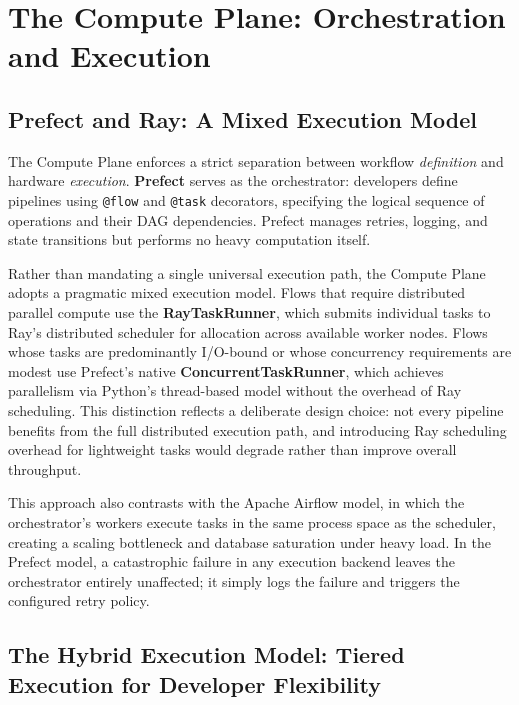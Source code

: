 \documentclass[12pt, a4paper]{report}
\begin{document}
\section{The Compute Plane: Orchestration and Execution}
\label{sec:compute_plane}

\subsection{Prefect and Ray: A Mixed Execution Model}
\label{ssec:prefect_ray}

The Compute Plane enforces a strict separation between workflow \emph{definition} and
hardware \emph{execution}.
\textbf{Prefect} serves as the orchestrator: developers define pipelines using
\texttt{@flow} and \texttt{@task} decorators, specifying the logical sequence of
operations and their DAG dependencies.
Prefect manages retries, logging, and state transitions but performs no heavy computation
itself.

Rather than mandating a single universal execution path, the Compute Plane adopts a
pragmatic mixed execution model. Flows that require distributed parallel compute use
the \textbf{RayTaskRunner}, which submits individual tasks to Ray's distributed
scheduler for allocation across available worker nodes. Flows whose tasks are
predominantly I/O-bound or whose concurrency requirements are modest use Prefect's
native \textbf{ConcurrentTaskRunner}, which achieves parallelism via Python's
thread-based model without the overhead of Ray scheduling. This distinction reflects a
deliberate design choice: not every pipeline benefits from the full distributed
execution path, and introducing Ray scheduling overhead for lightweight tasks would
degrade rather than improve overall throughput.

This approach also contrasts with the Apache Airflow model, in which the orchestrator's
workers execute tasks in the same process space as the scheduler, creating a scaling
bottleneck and database saturation under heavy load.
In the Prefect model, a catastrophic failure in any execution backend leaves the
orchestrator entirely unaffected; it simply logs the failure and triggers the configured
retry policy.

\subsection{The Hybrid Execution Model: Tiered Execution for Developer Flexibility}
\label{ssec:hybrid_execution}
\end{document}
